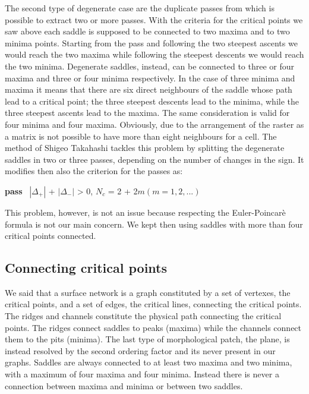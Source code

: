 The second type of degenerate case are the duplicate passes from which is possible to extract two or more passes. With the criteria for the critical points we saw above each saddle is supposed to be connected to two maxima and to two minima points. Starting from the pass and following the two steepest ascents we would reach the two maxima while following the steepest descents we would reach the two minima. Degenerate saddles, instead, can be connected to three or four maxima and three or four minima respectively. In the case of three minima and maxima it means that there are six direct neighbours of the saddle whose path lead to a critical point; the three steepest descents lead to the minima, while the three steepest ascents lead to the maxima. The same consideration is valid for four minima and four maxima. Obviously, due to the arrangement of the raster as a matrix is not possible to have more than eight neighbours for a cell. The method of Shigeo Takahashi tackles this problem by splitting the degenerate saddles in two or three passes, depending on the number of changes in the sign. It modifies then also the criterion for the passes as:

\textbf{pass} \ \quad \(|\Delta_+|\) + \(|\Delta_-|\) > 0, \quad \qquad \(N_c\) = 2 + 2\(m (m=1,2,...)\)

 This problem, however, is not an issue because respecting the Euler-Poincarè formula is not our main concern. We kept then using saddles with more than four critical points connected.

\subsection{Connecting critical points}
We said that a surface network is a graph constituted by a set of vertexes, the critical points, and a set of edges, the critical lines, connecting the critical points. The ridges and channels constitute the physical path connecting the critical points. The ridges connect saddles to peaks (maxima) while the channels connect them to the pits (minima). The last type of morphological patch, the plane, is instead resolved by the second ordering factor and its never present in our graphs. Saddles are always connected to at least two maxima and two minima, with a maximum of four maxima and four minima. Instead there is never a connection between maxima and minima or between two saddles.

